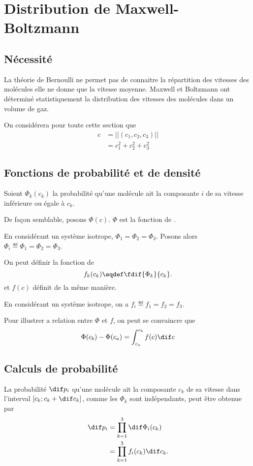 \section{Distribution de Maxwell-Boltzmann}
\subsection{Nécessité}
La théorie de Bernoulli ne permet pas de connaitre la répartition des vitesses
des molécules elle ne donne que la vitesse moyenne.
Maxwell et Boltzmann ont déterminé statistiquement la distribution
des vitesses des molécules dans un volume de gaz.

On considérera pour toute cette section que
\begin{align}
  c & = ||(c_1, c_2, c_3)||\label{eq:cci}\\
  & = c_1^2 + c_2^2 + c_3^2\nonumber
\end{align}

\subsection{Fonctions de probabilité et de densité}
Soient $\Phi_k(c_k)$ la probabilité qu'une molécule ait la composante $i$
de sa vitesse inférieure ou égale à $c_k$.

De façon semblable, posons $\Phi(c)$.
$\Phi$ est la fonction de .

En considérant un système isotrope,
$\Phi_1 = \Phi_2 = \Phi_3$.
Posons alors $\Phi_i \eqdef \Phi_1 = \Phi_2 = \Phi_3$.

On peut définir la fonction de 
\[ f_k(c_k) \eqdef \fdif{\Phi_k}{c_k}. \]
et $f(c)$ définit de la même manière.

En considérant un système isotrope,
on a $f_i \eqdef f_1 = f_2 = f_3$.

Pour illustrer a relation entre $\Phi$ et $f$, on peut se convaincre que
\[ \Phi(c_b) - \Phi(c_a) = \int_{c_a}^{c_b} f(c) \dif c \]

\subsection{Calculs de probabilité}
La probabilité $\dif p_i$ qu'une molécule ait
la composante $c_k$ de sa vitesse dans l'interval $[c_k; c_k + \dif c_k]$,
comme les $\Phi_k$ sont indépendants, peut être obtenue par
\begin{align*}
  \dif p_i & = \prod_{k=1}^3 \dif\Phi_i(c_k)\\
  & = \prod_{k=1}^3 f_i(c_k) \dif c_k.
\end{align*}

